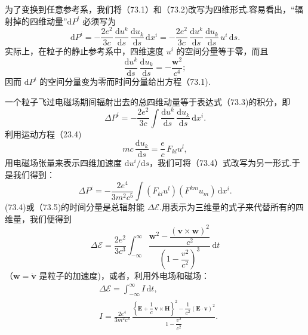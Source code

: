 为了变换到任意参考系，我们将（73.1）和（73.2)改写为四维形式.容易看出，“辐射掉的四维动量”$\mathrm{d}P^i$ 必须写为
\begin{equation}
  \mathrm{d}P^i=-\frac{2e^2}{3c}\,\frac{\mathrm{d}u^k}{\mathrm{d}s}\,\frac{\mathrm{d}u_k}{\mathrm{d}s}\,\mathrm{d}x^i
  =-\frac{2e^2}{3c}\,\frac{\mathrm{d}u^k}{\mathrm{d}s}\,\frac{\mathrm{d}u_k}{\mathrm{d}s}\,u^i\,\mathrm{d}s.
\end{equation}
实际上，在粒子的静止参考系中，四维速度 $u^i$ 的空间分量等于零，而且
\begin{equation*}
  \frac{\mathrm{d}u^k}{\mathrm{d}s}\,\frac{\mathrm{d}u_k}{\mathrm{d}s}=-\frac{\boldsymbol{w}^2}{c^4};
\end{equation*}
因而 $\mathrm{d}P^i$ 的空间分量变为零而时间分量给出方程（73.1).

一个粒子飞过电磁场期间辐射出去的总四维动量等于表达式（73.3)的积分，即
\begin{equation}
  \Delta P^i=-\frac{2e^2}{3c}\int\frac{\mathrm{d}u^k}{\mathrm{d}s}\,\frac{\mathrm{d}u_k}{\mathrm{d}s}\,\mathrm{d}x^i.
\end{equation}
利用运动方程（23.4)
\begin{equation*}
  mc\,\frac{\mathrm{d}u_k}{\mathrm{d}s}=\frac{e}{c}\,F_{kl}u^l,
\end{equation*}
用电磁场张量来表示四维加速度 $\mathrm{d}u^i/\mathrm{d}s$，我们可将（73.4）式改写为另一形式.于是我们得到：
\begin{equation}
  \Delta P^i=-\frac{2e^4}{3m^2c^5}\int(F_{kl}u^l)(F^{km}u_m)\,\mathrm{d}x^i.
\end{equation}
(73.4)或（73.5)的时间分量是总辐射能 $\Delta\mathcal{E}$.用表示为三维量的式子来代替所有的四维量，我们便得到
\begin{equation}
  \Delta\mathcal{E}=\frac{2e^2}{3c^3}\int_{-\infty}^{\infty}
  \frac{\boldsymbol{w}^2-\dfrac{(\boldsymbol{v}\times\boldsymbol{w})^2}{c^2}}{\left(1-\dfrac{v^2}{c^2}\right)^3}\,\mathrm{d}t
\end{equation}
（$\boldsymbol{w}=\dot{\boldsymbol{v}}$ 是粒子的加速度)，或者，利用外电场和磁场：
\begin{equation}
\begin{aligned}
  &\Delta\mathcal{E}=\int_{-\infty}^{\infty}I\,\mathrm{d}t,\\
  &I=\frac{2e^4}{3m^2c^3}\,
  \frac{\left\{\boldsymbol{E}+\dfrac{1}{c}\,\boldsymbol{v}\times\boldsymbol{H}\right\}^2-\dfrac{1}{c^2}(\boldsymbol{E}\cdot\boldsymbol{v})^2}{1-\dfrac{v^2}{c^2}}.
\end{aligned}
\end{equation}

